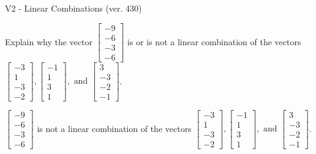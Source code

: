 \begin{exercise}
  \begin{exerciseTitle}V2 - Linear Combinations (ver. 430)\end{exerciseTitle}
  \begin{exerciseStatement}
    Explain why the vector \(\left[\begin{array}{c}
-9 \\
-6 \\
-3 \\
-6
\end{array}\right]\)  is or is not a linear 
	combination of the vectors \(\left[\begin{array}{c}
-3 \\
1 \\
-3 \\
-2
\end{array}\right] , \left[\begin{array}{c}
-1 \\
1 \\
3 \\
1
\end{array}\right] , \text{ and } \left[\begin{array}{c}
3 \\
-3 \\
-2 \\
-1
\end{array}\right]\).
	


  \end{exerciseStatement}
  \begin{exerciseAnswer}
   \(\left[\begin{array}{c}
-9 \\
-6 \\
-3 \\
-6
\end{array}\right]\) 
  	 is not  
	a linear combination of the vectors \(\left[\begin{array}{c}
-3 \\
1 \\
-3 \\
-2
\end{array}\right] , \left[\begin{array}{c}
-1 \\
1 \\
3 \\
1
\end{array}\right] , \text{ and } \left[\begin{array}{c}
3 \\
-3 \\
-2 \\
-1
\end{array}\right]\).

	
  


  \end{exerciseAnswer}
\end{exercise}